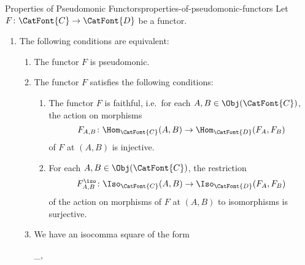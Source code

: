 \begin{proposition}{Properties of Pseudomonic Functors}{properties-of-pseudomonic-functors}%
    Let $F\colon\CatFont{C}\to\CatFont{D}$ be a functor.
    \begin{enumerate}
        \item\label{properties-of-pseudomonic-functors-characterisations}The following conditions are equivalent:
            \begin{enumerate}
                \item\label{properties-of-pseudomonic-functors-characterisations-a}The functor $F$ is pseudomonic.
                \item\label{properties-of-pseudomonic-functors-characterisations-b}The functor $F$ satisfies the following conditions:
                    \begin{enumerate}
                        \item\label{properties-of-pseudomonic-functors-characterisations-b-a}The functor $F$ is faithful, i.e.\ for each $A,B\in\Obj(\CatFont{C})$, the action on morphisms
                            \[
                                F_{A,B}
                                \colon
                                \Hom_{\CatFont{C}}(A,B)
                                \to
                                \Hom_{\CatFont{D}}(F_{A},F_{B})
                            \]%
                            of $F$ at $(A,B)$ is injective.
                        \item\label{properties-of-pseudomonic-functors-characterisations-b-b}For each $A,B\in\Obj(\CatFont{C})$, the restriction
                            \[
                                F^{\iso}_{A,B}
                                \colon
                                \Iso_{\CatFont{C}}(A,B)
                                \to
                                \Iso_{\CatFont{D}}(F_{A},F_{B})
                            \]%
                            of the action on morphisms of $F$ at $(A,B)$ to isomorphisms is surjective.
                    \end{enumerate}
                \item\label{properties-of-pseudomonic-functors-characterisations-c}We have an isocomma square of the form
                    \begin{webcompile}
                        \eqcong%
                        \isocomma_{},%
                        \quad
                        \begin{tikzcd}[row sep={5.0*\the\DL,between origins}, column sep={5.0*\the\DL,between origins}, background color=backgroundColor, ampersand replacement=\&]

\end{tikzcd}
\end{webcompile}
\end{enumerate}
\end{enumerate}
\end{proposition}
